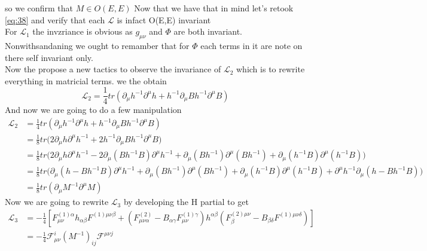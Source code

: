 \documentclass{article}
\begin{document}
so we confirm that $M \in O(E,E)$
Now that we have that in mind let's retook \eqref{eq:38} and verify that each $\mathcal{L}$ is infact O(E,E) invariant \\
For $\mathcal{L}_1$ the invzriance is obvious as $g_{\mu \nu}$ and $ \Phi$ are  both invariant. Nonwithsandaning we ought to remamber that for $\Phi$ each terms in it are note on there self invariant only.\\
Now the \cite{maharana1993noncompact} propose a new tactics to observe the invariance of $\mathcal{L}_2$ which is to rewrite everything in matricial terms.
we the obtain
\begin{equation*}
    \mathcal{L}_2 = \frac{1}{4}tr(\partial_{\mu}h^{-1}\partial^{\mu}h + h^{-1}\partial_\mu Bh^{-1}\partial^{\mu}B)
\end{equation*}
And now we are going to do a few manipulation
\begin{equation}
    \begin{aligned}
   \mathcal{L}_2 &= \frac{1}{4}tr(\partial_{\mu}h^{-1}\partial^{\mu}h + h^{-1}\partial_\mu Bh^{-1}\partial^{\mu}B)\\
&=\frac{1}{8}tr\Big(2\partial_\mu h\partial^\mu h^{-1}+2h^{-1}\partial_\mu B h^{-1}\partial^\mu B\Big)\\
&=\frac{1}{8}tr\Big(2\partial_\mu h\partial^\mu h^{-1}-2\partial_\mu(Bh^{-1}B)\partial^\mu h^{-1}+\partial_\mu(Bh^{-1})\partial^\mu(Bh^{-1})+\partial_\mu(h^{-1}B)\partial^\mu(h^{-1}B)\Big)\\
&=\frac{1}{8}tr\Big(\partial_\mu(h-Bh^{-1}B)\partial^\mu h^{-1}+\partial_\mu(Bh^{-1})\partial^\mu(Bh^{-1})+\partial_\mu(h^{-1}B)\partial^\mu(h^{-1}B)+\partial^\mu h^{-1}\partial_\mu(h-Bh^{-1}B)\Big)\\
&=\frac{1}{8}tr(\partial_\mu M^{-1}\partial^\mu M)
    \end{aligned}
\end{equation}
Now we are going to rewrite $\mathcal{L}_3$ by developing the H partial to get
\begin{equation}
    \begin{aligned}
    \mathcal{L}_3 &= -\frac{1}{4}[F^{(1)\alpha}_{\mu \nu }h_{\alpha \beta}F^{(1)\mu \nu \beta}+ (F^{(2)}_{\mu\nu \alpha}-B_{\alpha \gamma}F^{(1)\gamma}_{\mu \nu})h^{\alpha \beta}(F^{(2)\mu \nu}_{\beta}-B_{\beta \delta}F^{(1)\mu \nu \delta})]\\
    &=-\frac{1}{4} \mathcal{F}^i_{\mu \nu}(M^{-1})_{ij} \mathcal{F}^{\mu \nu j}
    \end{aligned}
\end{equation}
\end{document}
